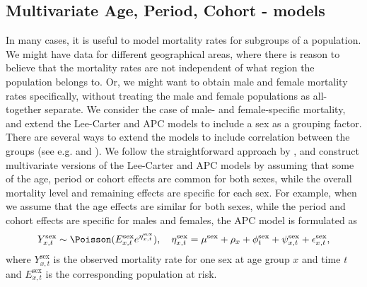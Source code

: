\subsection{Multivariate Age, Period, Cohort - models}
\label{sec:multivariateAPC}
In many cases, it is useful to model mortality rates for subgroups of a population. We might have data for different geographical areas, where there is reason to believe that the mortality rates are not independent of what region the population belongs to. Or, we might want to obtain male and female mortality rates specifically, without treating the male and female populations as all-together separate. We consider the case of male- and female-specific mortality, and extend the Lee-Carter and APC models to include a sex as a grouping factor. There are several ways to extend the models to include correlation between the groups (see e.g. \textcite{Wisniowski2015} and \textcite{RieblerHeldRue2012}). We follow the straightforward approach by \textcite{rieblerHeld2010}, and construct multivariate versions of the Lee-Carter and APC models by assuming that some of the age, period or cohort effects are common for both sexes, while the overall mortality level and remaining effects are specific for each sex. For example, when we assume that the age effects are similar for both sexes, while the period and cohort effects are specific for males and females, the APC model is formulated as
\begin{equation}
    Y_{x,t}^{\text{sex}} \sim \Poisson(E_{x,t}^{\text{sex}}e^{\eta_{x,t}^{\text{sex}}}), \quad \eta_{x,t}^{\text{sex}} = \mu^{\text{sex}} + \rho_x + \phi_t^{\text{sex}} + \psi_{x,t}^{\text{sex}} + \epsilon_{x,t}^{\text{sex}},
\end{equation}
where $Y_{x,t}^{\text{sex}}$ is the observed mortality rate for one sex at age group $x$ and time $t$ and $E_{x,t}^{\text{sex}}$ is the corresponding population at risk. 